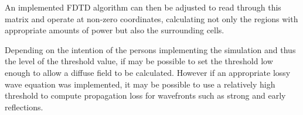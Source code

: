 

An implemented FDTD algorithm can then be adjusted to read through this matrix and operate at non-zero coordinates, calculating not only the regions with appropriate amounts of power but also the surrounding cells.

Depending on the intention of the persons implementing the simulation and thus the level of the threshold value, if may be possible to set the threshold low enough to allow a diffuse field to be calculated. However if an appropriate lossy wave equation was implemented, it may be possible to use a relatively high threshold to compute propagation loss for wavefronts such as strong and early reflections.\\
















